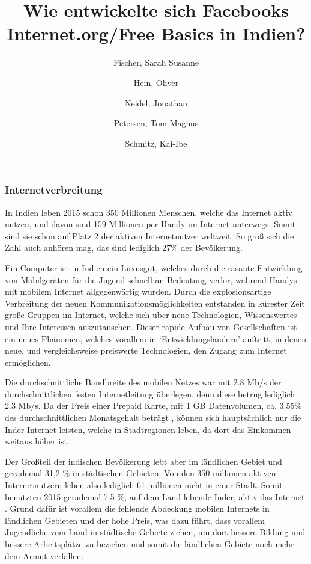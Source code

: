 \documentclass{article}
\title{Wie entwickelte sich Facebooks Internet.org/Free Basics in Indien?}
\author{
  Fischer, Sarah Susanne\\
  \and
  Hein, Oliver\\
  \and
  Neidel, Jonathan\\
  \and
  Petersen, Tom Magnus\\
  \and
  Schmitz, Kai-Ibe\\
}
\begin{document}
\maketitle
\subsubsection{Internetverbreitung}

In Indien leben 2015 schon 350 Millionen Menschen\autocite{slideshareIndia}, welche das Internet aktiv nutzen, und davon sind 159 Millionen per Handy im Internet unterwegs. Somit sind sie schon auf Platz 2 der aktiven Internetnutzer weltweit. So groß sich die Zahl auch anhören mag, das sind lediglich 27\% der Bevölkerung\autocite{InternetCountry}. 

Ein Computer ist in Indien ein Luxusgut, welches durch die rasante Entwicklung von Mobilgeräten für die Jugend schnell an Bedeutung verlor, während Handys mit mobilem Internet allgegenwärtig wurden.
Durch die explosionsartige Verbreitung der neuen Kommunikationsmöglichkeiten entstanden in kürester Zeit große Gruppen im Internet, welche sich über neue Technologien, Wissenswertes und Ihre Interessen auszutauschen.
Dieser rapide Aufbau von Gesellschaften ist ein neues Phänomen, welches vorallem in `Entwicklungsländern' auftritt, in denen neue, und vergleichsweise preiswerte Technologien, den Zugang zum Internet ermöglichen.   \textcite{empowermentThroughFacebook}

\medskip
Die durchschnittliche Bandbreite des mobilen Netzes war mit 2.8 Mb/s der durchschnittlichen festen Internetleitung überlegen, denn diese betrug lediglich 2.3 Mb/s\autocite{slideshareIndia}.
Da der Preis einer Prepaid Karte, mit 1 GB Datenvolumen, ca. 3.55\% des durchschnittlichen Monatsgehalt beträgt \autocite{broadbandAgency}, können sich hauptsächlich nur die Inder Internet leisten, welche in Stadtregionen leben, da dort das Einkommen weitaus höher ist.

 Der Großteil der indischen Bevölkerung lebt aber im ländlichen Gebiet  und gerademal 31,2 \% \autocite{IndiaBevölkerung} in städtischen Gebieten. 
Von den 350 millionen aktiven Internetnutzern leben also lediglich 61 millionen nicht in einer Stadt. Somit benutzten 2015 gerademal 7.5 \%, auf dem Land lebende Inder, aktiv das Internet \autocite{slideshareIndia}.
Grund dafür ist vorallem die fehlende Abdeckung mobilen Internets in ländlichen Gebieten und der hohe Preis, was dazu führt, dass vorallem Jugendliche vom Land in städtische Gebiete ziehen, um dort bessere Bildung und bessere Arbeitsplätze zu beziehen und somit die ländlichen Gebiete noch mehr dem Armut verfallen. 


\end{document}
